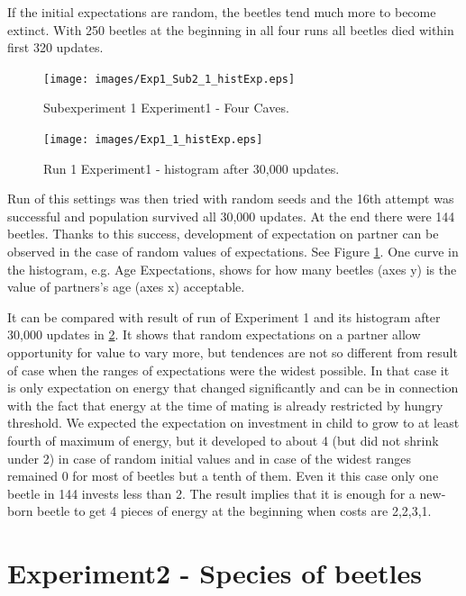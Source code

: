 \documentclass[a4paper,12pt]{report}
\begin{document}
If the initial expectations are random, the beetles tend much more to become extinct. With 250 beetles at the beginning in all four runs all beetles died within first 320 updates.

\begin{figure}
\begin{center}
  \texttt{[image: images/Exp1\_Sub2\_1\_histExp.eps]}
  \caption{Subexperiment 1 Experiment1 - Four Caves.}
  \label{img.Exp1_Sub2_1_histExp}
\end{center}
\end{figure}

\begin{figure}
\begin{center}
  \texttt{[image: images/Exp1\_1\_histExp.eps]}
  \caption{Run 1 Experiment1 - histogram after 30,000 updates.}
  \label{img.Exp1_1_histExp}
\end{center}
\end{figure}

Run of this settings was then tried with random seeds and the 16th attempt was successful and population survived all 30,000 updates. At the end there were 144 beetles. Thanks to this success, development of expectation on partner can be observed in the case of random values of expectations. See Figure \ref{img.Exp1_Sub2_1_histExp}. One curve in the histogram, e.g. Age Expectations, shows for how many beetles (axes y) is the value of partners's age (axes x) acceptable.

It can be compared with result of run of Experiment 1 and its histogram after 30,000 updates in \ref{img.Exp1_1_histExp}. It shows that random expectations on a partner allow opportunity for value to vary more, but tendences are not so different from result of case when the ranges of expectations were the widest possible. In that case it is only expectation on energy that changed significantly and can be in connection with the fact that energy at the time of mating is already restricted by hungry threshold. We expected the expectation on investment in child to grow to at least fourth of maximum of energy, but it developed to about 4 (but did not shrink under 2) in case of random initial values and in case of the widest ranges remained 0 for most of beetles but a tenth of them. Even it this case only one beetle in 144 invests less than 2. The result implies that it is enough for a new-born beetle to get 4 pieces of energy at the beginning when costs are 2,2,3,1.

\section{Experiment2 - Species of beetles}
\end{document}
